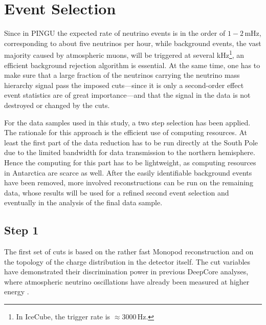 \section{Event Selection}
\label{sec:EvtSel}

Since in PINGU the expected rate of neutrino events is in the order of $1 -
2$\,mHz, corresponding to about five neutrinos per hour, while background
events, the vast majority caused by atmospheric muons, will be triggered at
several kHz\footnote{In IceCube, the trigger rate is $\approx 3000$\,Hz.}, an
efficient background rejection algorithm is essential. At the same time, one
has to make sure that a large fraction of the neutrinos carrying the neutrino
mass hierarchy signal pass the imposed cuts---since it is only a second-order
effect event statistics are of great importance---and that the signal in the
data is not destroyed or changed by the cuts.

For the data samples used in this study, a two step selection has been applied.
The rationale for this approach is the efficient use of computing resources.
At least the first part of the data reduction has to be run directly at the
South Pole due to the limited bandwidth for data transmission to the northern
hemisphere. Hence the computing for this part has to be lightweight, as
computing resources in Antarctica are scarce as well. After the easily
identifiable background events have been removed, more involved
reconstructions can be run on the remaining data, whose results will be used for
a refined second event selection and eventually in the analysis of the final
data sample.

\subsection{Step 1}
\label{sec:cuts_step1}

The first set of cuts is based on the rather fast Monopod reconstruction and on
the topology of the charge distribution in the detector itself. The cut
variables have demonstrated their discrimination power in previous DeepCore
analyses, where atmospheric neutrino oscillations have already been measured at
higher energy \cite{DCosc}.

